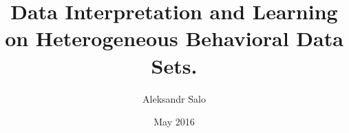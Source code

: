 \documentclass
[
]
{thesis}
\title{Data Interpretation and Learning on Heterogeneous Behavioral Data Sets.}
\author{Aleksandr Salo}
\date{May 2016}
\begin{document}
	
	 
	
	
	
	
	\thesisAppendixPage 
	\begin{appendices}
		\appendix
		
		
	\end{appendices}
	
	
	
\end{document}
